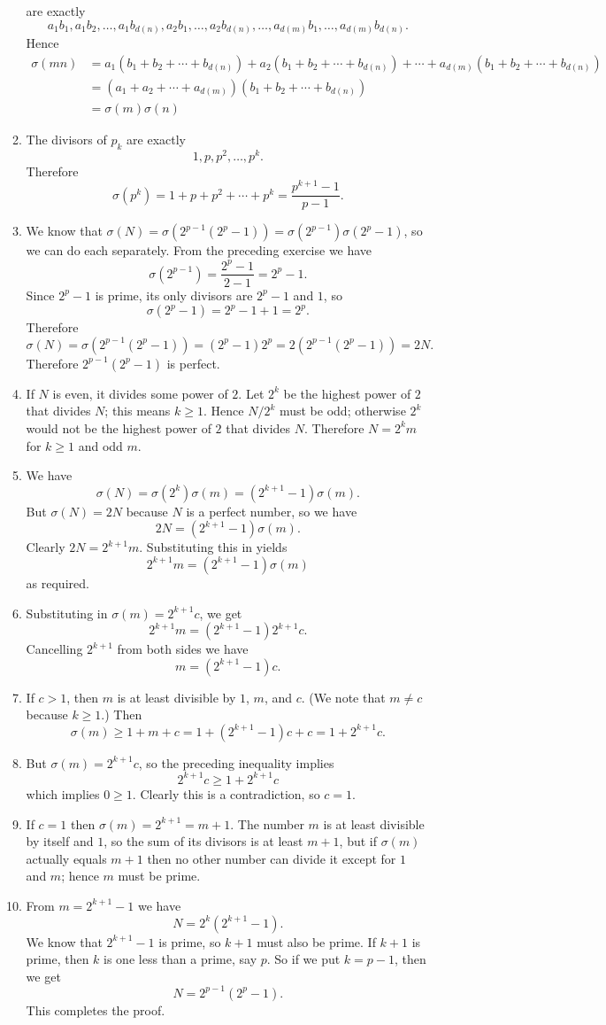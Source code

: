 \documentclass[a4paper,10pt]{article}
\begin{document}
\begin{enumerate}
\begin{enumerate}
  are exactly \[a_1b_1,a_1b_2,\ldots,a_1b_{d(n)},a_2b_1,\ldots,a_2b_{d(n)},\ldots,a_{d(m)}b_1,\ldots,a_{d(m)}b_{d(n)}.\]
  Hence \[
    \begin{split}
      \sigma(mn)&=a_1(b_1+b_2+\cdots+b_{d(n)})+a_2(b_1+b_2+\cdots+b_{d(n)})+\cdots+a_{d(m)}(b_1+b_2+\cdots+b_{d(n)})\\
                &=(a_1+a_2+\cdots+a_{d(m)})(b_1+b_2+\cdots+b_{d(n)})\\
      &=\sigma(m)\sigma(n)
    \end{split}
  \]
\item The divisors of \(p_k\) are exactly \[1,p,p^2,\ldots,p^k.\]
  Therefore \[\sigma(p^k)=1+p+p^2+\cdots+p^k=\frac{p^{k+1}-1}{p-1}.\]
\item We know that \(\sigma(N)=\sigma(2^{p-1}(2^p-1))=\sigma(2^{p-1})\sigma(2^p-1)\), so we can do each separately. From the
  preceding exercise we have \[\sigma(2^{p-1})=\frac{2^p-1}{2-1}=2^p-1.\]
  Since \(2^p-1\) is prime, its only divisors are \(2^p-1\) and \(1\), so \[\sigma(2^p-1)=2^p-1+1=2^p.\]
  Therefore \[\sigma(N)=\sigma(2^{p-1}(2^p-1))=(2^p-1)2^p=2(2^{p-1}(2^p-1))=2N.\]
  Therefore \(2^{p-1}(2^p-1)\) is perfect.
\item If \(N\) is even, it divides some power of \(2\). Let \(2^k\) be the highest power of \(2\) that divides \(N\); this
  means \(k\ge 1\). Hence \(N/2^k\) must be odd; otherwise \(2^k\) would not be the highest power of \(2\) that divides \(N\).
  Therefore \(N=2^km\) for \(k\ge 1\) and odd \(m\).
\item We have \[\sigma(N)=\sigma(2^k)\sigma(m)=(2^{k+1}-1)\sigma(m).\]
  But \(\sigma(N)=2N\) because \(N\) is a perfect number, so we have
  \[ 2N=(2^{k+1}-1)\sigma(m).\]
  Clearly \(2N=2^{k+1}m\). Substituting this in yields \[2^{k+1}m=(2^{k+1}-1)\sigma(m)\] as required.
\item Substituting in \(\sigma(m)=2^{k+1}c\), we get \[2^{k+1}m=(2^{k+1}-1)2^{k+1}c.\]
  Cancelling \(2^{k+1}\) from both sides we have \[m=(2^{k+1}-1)c.\]
\item If \(c>1\), then \(m\) is at least divisible by \(1\), \(m\), and \(c\). (We note that \(m\not=c\) because \(k\ge 1\).)
  Then \[\sigma(m)\ge 1+m+c=1+(2^{k+1}-1)c+c=1+2^{k+1}c.\]
\item But \(\sigma(m)=2^{k+1}c\), so the preceding inequality implies \[2^{k+1}c\ge1+2^{k+1}c\] which implies \(0\ge1\). Clearly
  this is a contradiction, so \(c=1\).
\item If \(c=1\) then \(\sigma(m)=2^{k+1}=m+1\). The number \(m\) is at least divisible by itself and \(1\), so the sum of its
  divisors is at least \(m+1\), but if \(\sigma(m)\) actually equals \(m+1\) then no other number can divide it except for \(1\) and \(m\);
  hence \(m\) must be prime.
\item From \(m=2^{k+1}-1\) we have \[N=2^k(2^{k+1}-1).\] We know that \(2^{k+1}-1\) is prime, so \(k+1\) must also be prime. If \(k+1\)
  is prime, then \(k\) is one less than a prime, say \(p\). So if we put \(k=p-1\), then we get
  \[N=2^{p-1}(2^p-1).\] This completes the proof.
  

\end{enumerate}
\end{enumerate}
\end{document}
